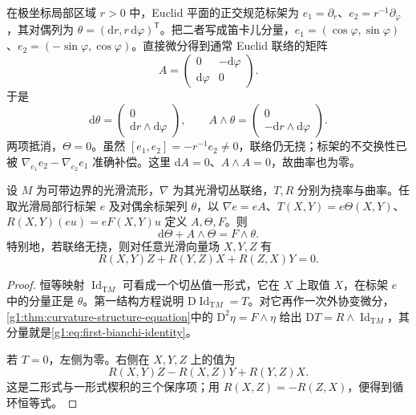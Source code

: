 \begin{example}\label{g1:exm:polar-torsion-cancellation}
	在极坐标局部区域 \(r>0\) 中，Euclid 平面的正交规范标架为 \(e_1=\partial_r\)、\(e_2=r^{-1}\partial_\varphi\)，其对偶列为 \(\theta=(\mathrm{d}r,r\,\mathrm{d}\varphi)^{\mathsf T}\)。把二者写成笛卡儿分量，\(e_1=(\cos\varphi,\sin\varphi)\)、\(e_2=(-\sin\varphi,\cos\varphi)\)。直接微分得到通常 Euclid 联络的矩阵
	\[
		A=\begin{pmatrix}0&-\mathrm{d}\varphi\\\mathrm{d}\varphi&0\end{pmatrix}.
	\]
	于是
	\[
		\mathrm{d}\theta=\begin{pmatrix}0\\\mathrm{d}r\wedge\mathrm{d}\varphi\end{pmatrix},\qquad
		A\wedge\theta=\begin{pmatrix}0\\-\mathrm{d}r\wedge\mathrm{d}\varphi\end{pmatrix}.
	\]
	两项抵消，\(\Theta=0\)。虽然 \([e_1,e_2]=-r^{-1}e_2\ne0\)，联络仍无挠；标架的不交换性已被 \(\nabla_{e_1}e_2-\nabla_{e_2}e_1\) 准确补偿。这里 \(\mathrm{d}A=0\)、\(A\wedge A=0\)，故曲率也为零。
\end{example}

\begin{proposition}\label{g1:prop:first-bianchi-identity}
	设 \(M\) 为可带边界的光滑流形，\(\nabla\) 为其光滑切丛联络，\(T,R\) 分别为挠率与曲率。任取光滑局部行标架 \(e\) 及对偶余标架列 \(\theta\)，以 \(\nabla e=eA\)、\(T(X,Y)=e\Theta(X,Y)\)、\(R(X,Y)(eu)=eF(X,Y)u\) 定义 \(A,\Theta,F\)。则
	\begin{equation}\label{g1:eq:first-bianchi-identity}
		\mathrm{d}\Theta+A\wedge\Theta=F\wedge\theta.
	\end{equation}
	特别地，若联络无挠，则对任意光滑向量场 \(X,Y,Z\) 有
	\begin{equation}\label{g1:eq:torsion-free-cyclic-curvature}
		R(X,Y)Z+R(Y,Z)X+R(Z,X)Y=0.
	\end{equation}
\end{proposition}
\begin{proof}
	恒等映射 \(\operatorname{Id}_{\mathrm{T}M}\) 可看成一个切丛值一形式，它在 \(X\) 上取值 \(X\)，在标架 \(e\) 中的分量正是 \(\theta\)。第一结构方程说明 \(\mathrm{D}\operatorname{Id}_{\mathrm{T}M}=T\)。对它再作一次外协变微分，\cref{g1:thm:curvature-structure-equation}中的 \(\mathrm{D}^2\eta=F\wedge\eta\) 给出 \(\mathrm{D}T=R\wedge\operatorname{Id}_{\mathrm{T}M}\)，其分量就是\eqref{g1:eq:first-bianchi-identity}。

	若 \(T=0\)，左侧为零。右侧在 \(X,Y,Z\) 上的值为
	\[
		R(X,Y)Z-R(X,Z)Y+R(Y,Z)X.
	\]
	这是二形式与一形式楔积的三个保序项；用 \(R(X,Z)=-R(Z,X)\)，便得到循环恒等式。
\end{proof}

